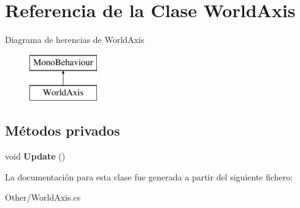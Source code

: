 \hypertarget{class_world_axis}{}\section{Referencia de la Clase World\+Axis}
\label{class_world_axis}
Diagrama de herencias de World\+Axis\begin{figure}[H]
\begin{center}
\leavevmode
\includegraphics[height=2.000000cm]{class_world_axis}
\end{center}
\end{figure}
\subsection*{Métodos privados}
\begin{DoxyCompactItemize}
\item 
\mbox{\label{class_world_axis_a117b9971cb01008a0b0cef393b2abb3b}} 
void {\bfseries Update} ()
\end{DoxyCompactItemize}


La documentación para esta clase fue generada a partir del siguiente fichero\+:\begin{DoxyCompactItemize}
\item 
Other/World\+Axis.\+cs\end{DoxyCompactItemize}
